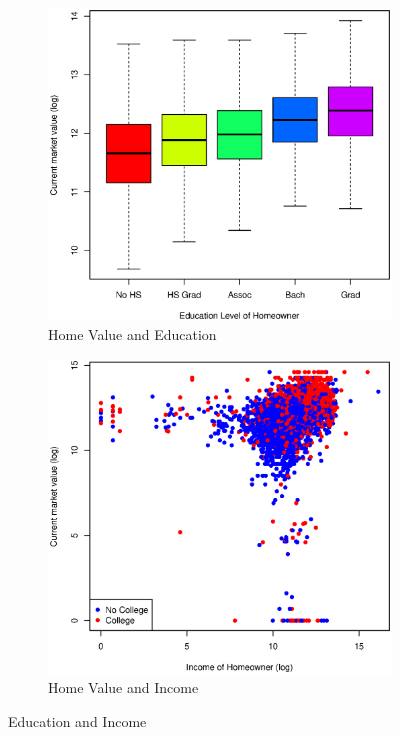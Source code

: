 \documentclass[11pt, fleqn]{article}
\begin{document}
\begin{figure}
  \centering
  \begin{subfigure}[b]{0.49\textwidth}
    \includegraphics[width=\textwidth]{hhgrad.eps}
    \caption{Home Value and Education}
    \label{fig:hhgrad}
  \end{subfigure}
  \hfill
  \begin{subfigure}[b]{0.49\textwidth}
    \includegraphics[width=\textwidth]{income.eps}
    \caption{Home Value and Income}
    \label{fig:income}
  \end{subfigure}
  \caption{Education and Income}
\end{figure}
\end{document}
